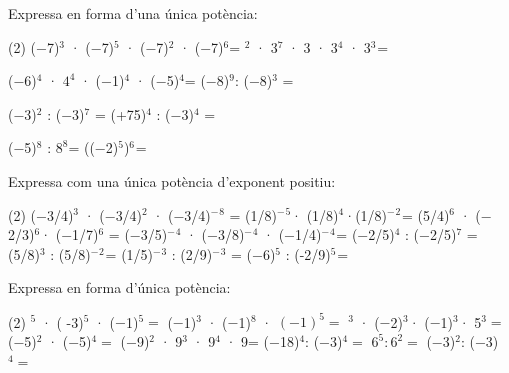 \begin{mylist}
\exer \spen Expressa en forma d'una única potència:  

\begin{tasks}(2)
\task   ($-$7)${}^{3}$ · ($-$7)${}^{5}$ · ($-$7)${}^{2}$ · ($-$7)${}^{6 }$=    ${}^{2}$ · 3${}^{7}$ · 3 · 3${}^{4}$ · 3${}^{3}$${}^{ }$=

 \task   ($-$6)${}^{4}$ · ${4}^{4}$ · ($-$1)${}^{4}$ · ($-$5)${}^{4}$=   \task  ($-$8)${}^{9}$: ($-$8)${}^{3}$  =

\task   ($-$3)${}^{2}$ :  ($-$3)${}^{7}$ =    \task   (+75)${}^{4}$ : ($-$3)${}^{4}$  =  

 \task  ($-$5)${}^{8}$ : ${8}^{8}$=    \task   (($-$2)${}^{5}$)${}^{6}$${}^{ }$=
\answers{[$(-7)^{16}$, $3^{17}$, $120^4$, $8^6$, $(-3)^{-3}$, $(-25)^4$, $(-5/8)^8$, $(-2)^{30}$]}


 \end{tasks}


\exer  Expressa com una única potència d'exponent positiu:  

\begin{tasks}(2)
\task  (\textbf{$-$}3/4)${}^{3}$ · (\textbf{$-$}3/4)${}^{2}$ · (\textbf{$-$}3/4)\textbf{${}^{-}$}${}^{8}$ =  \task   (1/8)\textbf{${}^{-}$}${}^{5}$· (1/8)${}^{4}$·(1/8)${}^{-}$${}^{2}$${}^{ }$=
\task   (5/4)${}^{6}$ · (\textbf{$-$}2/3)${}^{6}$· (\textbf{$-$}1/7)${}^{6}$ =  \task   (\textbf{$-$}3/5)${}^{-}$${}^{4}$ · (\textbf{$-$}3/8)${}^{-}$${}^{4}$ · (\textbf{$-$}1/4)\textbf{${}^{-}$}${}^{4}$${}^{ }$=
 \task   ($-$2/5)${}^{4}$ : ($-$2/5)${}^{7}$ =   \task    (5/8)${}^{3}$ : (5/8)${}^{-}$${}^{2}$${}^{ }$=
 \task    (1/5)${}^{-}$${}^{3}$ : (2/9)${}^{-}$${}^{3}$ =    \task    ($-$6)${}^{5}$ : (-2/9)${}^{5}$${}^{ }$=
\end{tasks}
 \answers{[$\left(-\frac{4}{3} \right)^{2}$, $\left(\frac{1}{8} \right)^{-3}=8^3$, $\left(\frac{5}{42} \right)^6$, $\left(\frac{160}{9} \right)^4$, $\left(-\frac{5}{2} \right)^3$, $\left(\frac{5}{8} \right)^5$, $\left(\frac{10}{9} \right)^3$, $27^5$]}


\exer Expressa en forma d'única potència:
\begin{tasks}(2)
${}^{5 }$ · ( -3)${}^{5}$ · ($-$1)${}^{5 }=$    \task ($-$1)${}^{3}$ · ($-$1)${}^{8}$ · ${(-1)}^{5}=$ 
${}^{3}$ · ($-$2)${}^{3}$· ($-$1)${}^{3 }$· 5${}^{3}=$    \task ($-$5)${}^{2}$ · ($-$5)${}^{4}=$  
\task ($-$9)${}^{2}$ · 9${}^{3}$ · 9${}^{4}$ · 9=     \task ($-$18)${}^{4}$: ($-$3)${}^{4}=$   
\task ${6}^{5} : {6}^{2}=$     \task ($-$3)${}^{2}$: ($-$3)${}^{4}=$
\end{tasks}
\answers{[$6^5$, $1$, $40^3$, $5^6$, $9^{10}$, $6^4$, $6^3$, $(-3)^{-2}$]} 



\end{mylist}
